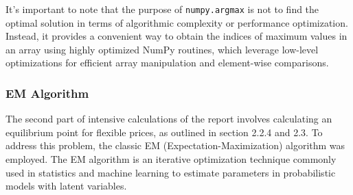 \documentclass[a4paper,12pt]{article}
\begin{document}
It's important to note that the purpose of \texttt{numpy.argmax} is not to find the optimal solution in terms of algorithmic complexity or performance optimization.
Instead, it provides a convenient way to obtain the indices of maximum values in an array using highly optimized NumPy routines, which leverage low-level optimizations for efficient array manipulation and element-wise comparisons.\\

\subsubsection{EM Algorithm}

The second part of intensive calculations of the report involves calculating an equilibrium point for flexible prices, as outlined in section 2.2.4 and 2.3.
To address this problem, the classic EM (Expectation-Maximization) algorithm was employed.
The EM algorithm is an iterative optimization technique commonly used in statistics and machine learning to estimate parameters in probabilistic models with latent variables.\\


\end{document}
